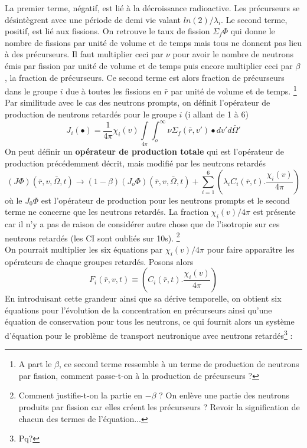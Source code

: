 La premier terme, négatif, est lié à la décroissance radioactive. Les précurseurs se désintègrent 
avec une période de demi vie valant $ln(2)/\lambda_i$. Le second terme, positif, est lié aux fissions. 
On retrouve le taux de fission $\Sigma_f\varPhi$ qui donne le nombre de fissions par unité de volume 
et de temps mais tous ne donnent pas lieu à des précurseurs. Il faut multiplier ceci par $\nu$ pour 
avoir le nombre de neutrons émis par fission par unité de volume et de temps puis encore multiplier ceci par 
$\beta$, la fraction de précurseurs. Ce second terme est alors fraction de précurseurs dans le groupe $i$ 
due à toutes les fissions en $\bar r$  par unité de volume et de temps.
\footnote{A part le $\beta$, ce second terme ressemble à un terme de production de neutrons par fission,
comment passe-t-on à la production de précurseurs ?}\\

Par similitude avec le cas des neutrons prompts, on définit l'opérateur de production de neutrons 
retardés pour le groupe $i$ (i allant de 1 à 6)
\begin{equation}
{J_i}( \bullet ) = \frac{1}{{4\pi }}{\chi _i}(v)\int\limits_{4\pi }    \int_o^\infty     \nu {\Sigma _f}(\bar r,v') \bullet dv'd\bar \Omega '
\end{equation}
On peut définir un \textbf{opérateur de production totale} qui est l'opérateur de production 
précédemment décrit, mais modifié par les neutrons retardés
\begin{equation}
(J\varPhi )(\bar r,v,\bar \Omega ,t) \to (1 - \beta )({J_o}\varPhi )(\bar r,v,\bar \Omega ,t) + \sum\limits_{i = 1}^6    \left( {{\lambda _i}{C_i}(\bar r,t).\frac{{{\chi _i}(v)}}{{4\pi }}} \right)
\end{equation}
où le $J_0\varPhi$ est l'opérateur de production pour les neutrons prompts et le second terme ne concerne que les 
neutrons retardés. La fraction $\chi_i(v)/4\pi$ est présente car il n'y a pas de raison de considérer 
autre chose que de l'isotropie sur ces  neutrons retardés (les CI sont oubliés sur 10s).
\footnote{Comment justifie-t-on la partie en $-\beta$ ? On enlève une partie des neutrons produits par fission
car elles créent les précurseurs ? Revoir la signification de chacun des termes de l'équation...}\\

On pourrait multiplier les six équations par $\chi_i(v)/4\pi$ pour faire apparaître les opérateurs 
de chaque groupes retardés. Posons alors
\begin{equation}
{F_i}(\bar r,v,t) \equiv \left( {{C_i}(\bar r,t).\frac{{{\chi _i}(v)}}{{4\pi }}} \right)
\end{equation}
En introduisant cette grandeur ainsi que sa dérive temporelle, on obtient six équations pour l'évolution
de la concentration en précurseurs ainsi qu'une équation de conservation pour tous les neutrons, ce qui
fournit alors un système d'équation pour le problème de transport neutronique avec neutrons retardés\footnote{Pq?} :\\

